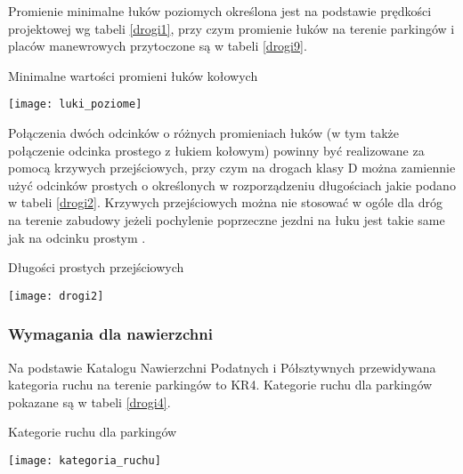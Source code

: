 \documentclass[twoside,12pt]{article}
\begin{document}
	Promienie minimalne łuków poziomych określona jest na podstawie prędkości projektowej wg tabeli \ref{drogi1}, przy czym promienie łuków na terenie parkingów i placów manewrowych przytoczone są w tabeli \ref{drogi9}.
	\begin{table}[H]
		\centering
		\caption{Minimalne wartości promieni łuków kołowych}
		\texttt{[image: luki\_poziome]}\\
		\label{drogi1}
	\end{table}
	
	Połączenia dwóch odcinków o różnych promieniach łuków (w tym także połączenie odcinka prostego z łukiem kołowym) powinny być realizowane za pomocą krzywych przejściowych, przy czym na drogach klasy D można zamiennie użyć odcinków prostych o określonych w rozporządzeniu długościach jakie podano w tabeli \ref{drogi2}. Krzywych przejściowych można nie stosować w ogóle dla dróg na terenie zabudowy jeżeli pochylenie poprzeczne jezdni na łuku jest takie same jak na odcinku prostym \cite{rozporzadzenie_drogi}.
		\begin{table}[H]
		\centering
		\caption{Długości prostych przejściowych}
		\texttt{[image: drogi2]}\\
		\label{drogi2}
	\end{table}
	
	\subsubsection{Wymagania dla nawierzchni}
	
	Na podstawie Katalogu Nawierzchni Podatnych i Półsztywnych przewidywana kategoria ruchu na terenie parkingów to KR4. Kategorie ruchu dla parkingów pokazane są w tabeli \ref{drogi4}. 
		\begin{table}[H]
		\centering
		\caption{Kategorie ruchu dla parkingów}
		\texttt{[image: kategoria\_ruchu]}\\
		\label{drogi4}
	\end{table}	
	
\end{document}
